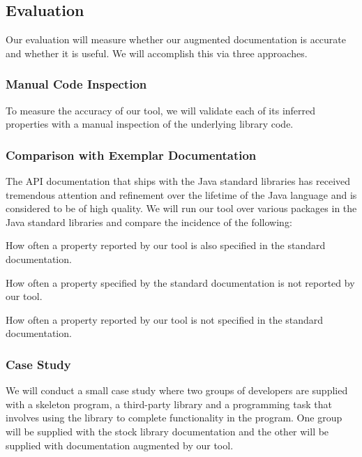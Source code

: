\documentclass[letterpaper,12pt]{article}
\let\Itemize =\itemize
\def\Nospacing{\itemsep=0pt\topsep=0pt\partopsep=0pt\parskip=0pt\parsep=0pt}
\renewenvironment{itemize}{\Itemize\Nospacing}{\endlist}
\begin{document}
\subsection*{Evaluation}

Our evaluation will measure whether our augmented documentation is accurate
and whether it is useful. We will accomplish this via three approaches.

\subsubsection*{Manual Code Inspection}
To measure the accuracy of our tool, we will validate each of its inferred
properties with a manual inspection of the underlying library code.

\subsubsection*{Comparison with Exemplar Documentation}
The API documentation that ships with the Java standard libraries has received
tremendous attention and refinement over the lifetime of the Java language and
is considered to be of high quality. We will run our tool over various packages
in the Java standard libraries and compare the incidence of the following:

\begin{itemize}
\item How often a property reported by our tool is also specified in the
  standard documentation.

\item How often a property specified by the standard documentation is not
  reported by our tool.

\item How often a property reported by our tool is not specified in the
  standard documentation.
\end{itemize}

\subsubsection*{Case Study}
We will conduct a small case study where two groups of developers are supplied
with a skeleton program, a third-party library and a programming task that
involves using the library to complete functionality in the program. One group
will be supplied with the stock library documentation and the other will be
supplied with documentation augmented by our tool.
\end{document}
